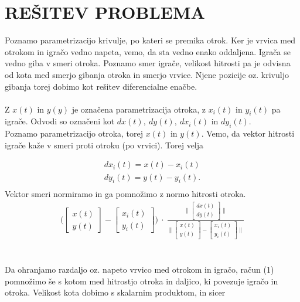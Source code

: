 \documentclass[a4paper,12pt]{article}
\begin{document}
\newpage
\section{\textsc{\large{REŠITEV PROBLEMA}}}

Poznamo parametrizacijo krivulje, po kateri se premika otrok. Ker je vrvica med otrokom in 
igračo vedno napeta, vemo, da sta vedno enako oddaljena. Igrača se vedno giba v smeri otroka. 
Poznamo smer igrače, velikost hitrosti pa je odvisna od kota med smerjo gibanja otroka in smerjo vrvice.
Njene pozicije oz. krivuljo gibanja torej dobimo kot rešitev diferencialne enačbe.
\\
\\
Z $x(t)$ in $y(y)$ je označena parametrizacija otroka, z $x_i(t)$ in $y_i(t)$ pa igrače. Odvodi so označeni kot $dx(t), \ dy(t), \ dx_i(t)$ in $dy_i(t)$. \\
Poznamo parametrizacijo otroka, torej $x(t)$ in $y(t)$. Vemo, da vektor hitrosti igrače kaže v smeri proti otroku (po vrvici).
Torej velja

\begin{align*}
    dx_i(t) = x(t) - x_i(t) \\
    dy_i(t) = y(t) - y_i(t). \\
\end{align*}
Vektor smeri normiramo in ga pomnožimo z normo hitrosti otroka.
\\
\begin{align}
     \Big(
    \begin{bmatrix} 
        x(t) \\
        y(t)
    \end{bmatrix}
    -
    \begin{bmatrix} 
        x_i(t) \\
        y_i(t) 
    \end{bmatrix}
    \Big)
    \ \cdot \
    \frac{
    \Big \|
    \begin{bmatrix} 
        dx(t) \\
        dy(t)
    \end{bmatrix}
    \Big \|
    }
    {
    \Big \|
    \begin{bmatrix} 
        x(t) \\
        y(t)
    \end{bmatrix}
    -
    \begin{bmatrix} 
        x_i(t) \\
        y_i(t) 
    \end{bmatrix}
    \Big \|
    }
\end{align}
\\
\\
Da ohranjamo razdaljo oz. napeto vrvico med otrokom in igračo, račun (1) pomnožimo še 
s kotom med hitrostjo otroka in daljico, ki povezuje igračo in otroka. 
Velikost kota dobimo s skalarnim produktom, in sicer
\end{document}
